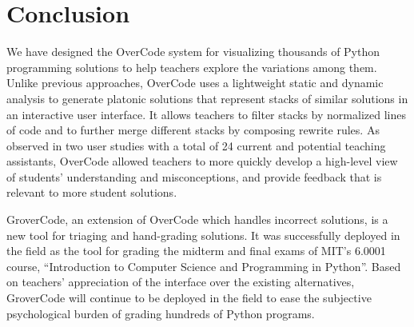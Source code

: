 
\section{Conclusion}
We have designed the OverCode system for visualizing thousands of Python programming solutions to help teachers explore the variations among them. Unlike previous approaches, OverCode uses a lightweight static and dynamic analysis to generate platonic solutions that represent stacks of similar solutions in an interactive user interface. It allows teachers to filter stacks by normalized lines of code and to further merge different stacks by composing rewrite rules. As observed in two user studies with a total of 24 current and potential teaching assistants, OverCode allowed teachers to more quickly develop a high-level view of students' understanding and misconceptions, and provide feedback that is relevant to more student solutions. 

GroverCode, an extension of OverCode which handles incorrect solutions, is a new tool for triaging and hand-grading solutions. It was successfully deployed in the field as the tool for grading the midterm and final exams of MIT's 6.0001 course, ``Introduction to Computer Science and Programming in Python''. Based on teachers' appreciation of the interface over the existing alternatives, GroverCode will continue to be deployed in the field to ease the subjective psychological burden of grading hundreds of Python programs. %
